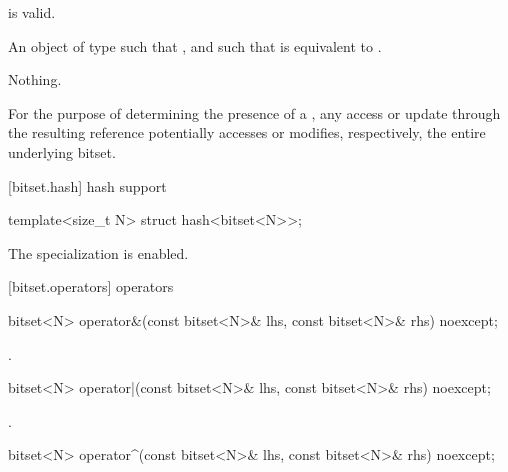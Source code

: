 \begin{itemdescr}
\pnum
\expects
{} is valid.

\pnum
\returns
An object of type
such that
,
and such that
is equivalent to
.

\pnum
\throws
Nothing.

\pnum
\remarks
For the purpose of determining the presence of a
, any access or update through the resulting
reference potentially accesses or modifies, respectively, the entire
underlying bitset.
\end{itemdescr}

[bitset.hash]{ hash support}

%
\begin{itemdecl}
template<size_t N> struct hash<bitset<N>>;
\end{itemdecl}

\begin{itemdescr}
\pnum
The specialization is enabled.
\end{itemdescr}


[bitset.operators]{ operators}

%
\begin{itemdecl}
bitset<N> operator&(const bitset<N>& lhs, const bitset<N>& rhs) noexcept;
\end{itemdecl}

\begin{itemdescr}
\pnum
\returns
{}.
\end{itemdescr}

%
\begin{itemdecl}
bitset<N> operator|(const bitset<N>& lhs, const bitset<N>& rhs) noexcept;
\end{itemdecl}

\begin{itemdescr}
\pnum
\returns
{}.
\end{itemdescr}

%
\begin{itemdecl}
bitset<N> operator^(const bitset<N>& lhs, const bitset<N>& rhs) noexcept;
\end{itemdecl}

